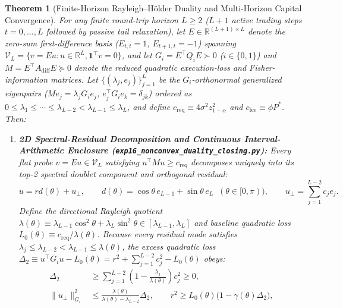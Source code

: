 \documentclass[12pt]{article}
\newtheorem{theorem}{Theorem}[section]
\theoremstyle{definition}
\theoremstyle{remark}
\begin{document}


\begin{theorem}[Finite-Horizon Rayleigh--H\"older Duality and Multi-Horizon Capital Convergence]
\label{thm:ia_nonconvex_duality}
For any finite round-trip horizon $L \ge 2$ ($L+1$ active trading steps $t=0, \dots, L$ followed by passive tail relaxation), let $E \in \mathbb{R}^{(L+1) \times L}$ denote the zero-sum first-difference basis ($E_{t,t}=1$, $E_{t+1,t}=-1$) spanning $\mathcal{V}_L = \{v = E u : u \in \mathbb{R}^L, \mathbf{1}^\top v = 0\}$, and let $G_i = E^\top Q_i E \succ 0$ ($i \in \{0, 1\}$) and $M = E^\top A_{\mathrm{diff}} E \succeq 0$ denote the reduced quadratic execution-loss and Fisher-information matrices. Let $\{(\lambda_j, e_j)\}_{j=1}^L$ be the $G_i$-orthonormal generalized eigenpairs ($M e_j = \lambda_j G_i e_j$, $e_j^\top G_i e_k = \delta_{jk}$) ordered as $0 \le \lambda_1 \le \cdots \le \lambda_{L-2} < \lambda_{L-1} \le \lambda_L$, and define $c_{\mathrm{req}} \equiv 4\sigma^2 z_{1-\alpha}^2$ and $c_{\mathrm{fee}} \equiv \phi P^*$. Then:
\begin{enumerate}
\item \textbf{2D Spectral-Residual Decomposition and Continuous Interval-Arithmetic Enclosure (\nolinkurl{exp16_nonconvex_duality_closing.py}):} Every flat probe $v = E u \in \mathcal{V}_L$ satisfying $u^\top M u \ge c_{\mathrm{req}}$ decomposes uniquely into its top-2 spectral doublet component and orthogonal residual:
\begin{equation}
u = r d(\theta) + u_\perp, \qquad d(\theta) = \cos\theta\, e_{L-1} + \sin\theta\, e_L \;\;(\theta \in [0, \pi)), \qquad u_\perp = \sum_{j=1}^{L-2} c_j e_j.
\end{equation}
Define the directional Rayleigh quotient $\lambda(\theta) \equiv \lambda_{L-1}\cos^2\theta + \lambda_L\sin^2\theta \in [\lambda_{L-1}, \lambda_L]$ and baseline quadratic loss $L_0(\theta) \equiv c_{\mathrm{req}}/\lambda(\theta)$. Because every residual mode satisfies $\lambda_j \le \lambda_{L-2} < \lambda_{L-1} \le \lambda(\theta)$, the excess quadratic loss $\Delta_2 \equiv u^\top G_i u - L_0(\theta) = r^2 + \sum_{j=1}^{L-2} c_j^2 - L_0(\theta)$ obeys:
\begin{equation}
\begin{aligned}
\Delta_2 &\ge \sum_{j=1}^{L-2} \left(1 - \frac{\lambda_j}{\lambda(\theta)}\right) c_j^2 \ge 0, \\
\|u_\perp\|_{G_i}^2 &\le \frac{\lambda(\theta)}{\lambda(\theta) - \lambda_{L-2}}\Delta_2, \qquad r^2 \ge L_0(\theta)\bigl(1 - \gamma(\theta)\Delta_2\bigr),

\end{aligned}
\end{equation}
\end{enumerate}
\end{theorem}
\end{document}
